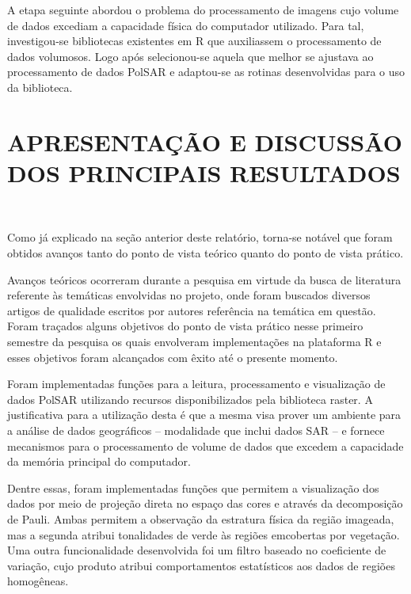 \documentclass[12pt,letterpaper]{article}
\begin{document}
A etapa seguinte abordou o problema do processamento de imagens cujo volume de dados excediam a capacidade física do computador utilizado. Para tal, investigou-se bibliotecas existentes em R que auxiliassem o processamento de dados volumosos. Logo após selecionou-se aquela que melhor se ajustava ao processamento de dados PolSAR e adaptou-se as rotinas desenvolvidas para o uso da biblioteca.

\newpage
\section*{\centering \textbf{APRESENTAÇÃO E DISCUSSÃO DOS PRINCIPAIS RESULTADOS}}
\hrulefill \\

\vspace{0.5cm}

Como já explicado na seção anterior deste relatório, torna-se notável que foram obtidos avanços tanto do ponto de vista teórico quanto do ponto de vista prático.

Avanços teóricos ocorreram durante a pesquisa em virtude da busca de literatura referente às temáticas envolvidas no projeto, onde foram buscados diversos artigos de qualidade escritos por autores referência na temática em questão. Foram traçados alguns objetivos do ponto de vista prático nesse primeiro semestre da pesquisa os quais envolveram implementações na plataforma R e esses objetivos foram alcançados com êxito até o presente momento.

Foram implementadas funções para a leitura, processamento e visualização de dados PolSAR utilizando recursos disponibilizados pela biblioteca raster. A justificativa para a utilização desta é que a mesma visa prover um ambiente para a análise de dados geográficos -- modalidade que inclui dados SAR -- e fornece mecanismos para o processamento de volume de dados que excedem a capacidade da memória principal do computador. 

Dentre essas, foram implementadas funções que permitem a visualização dos dados por meio de projeção direta no espaço das cores e através da decomposição de Pauli. Ambas permitem a observação da estratura física da região imageada, mas a segunda atribui tonalidades de verde às regiões emcobertas por vegetação. Uma outra funcionalidade desenvolvida foi um filtro baseado no coeficiente de variação, cujo produto atribui comportamentos estatísticos aos dados de regiões homogêneas.
\end{document}
